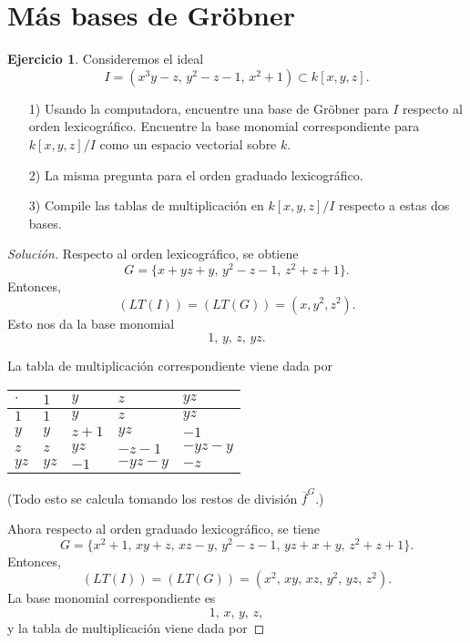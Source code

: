 \documentclass{article}
\theoremstyle{definition}
\newtheorem{ejerc}{Ejercicio}
\newenvironment{solucion}{\begin{proof}[Solución]}{\end{proof}}
\begin{document}

\section*{Más bases de Gröbner}

\begin{ejerc}
  Consideremos el ideal
  $$I = (x^3 y - z, \, y^2 - z - 1, \, x^2 + 1) \subset k[x,y,z].$$

  \begin{enumerate}
  \item[1)] Usando la computadora, encuentre una base de Gröbner para $I$
    respecto al orden lexicográfico. Encuentre la base monomial correspondiente
    para $k[x,y,z]/I$ como un espacio vectorial sobre $k$.

  \item[2)] La misma pregunta para el orden graduado lexicográfico.

  \item[3)] Compile las tablas de multiplicación en $k[x,y,z]/I$ respecto a
    estas dos bases.
  \end{enumerate}

  \ifdefined\solutions\begin{solucion}
    Respecto al orden lexicográfico, se obtiene
    $$G = \{ x+yz+y, \, y^2-z-1, \, z^2+z+1 \}.$$
    Entonces,
    $$(LT (I)) = (LT (G)) = (x, y^2, z^2).$$
    Esto nos da la base monomial
    $$1, \, y, \, z, \, yz.$$

    La tabla de multiplicación correspondiente viene dada por
    \begin{center}
\begin{tabular}{f{1.25cm}|f{1.25cm}|f{1.25cm}|f{1.25cm}|f{1.25cm}}
$\cdot$ & $1$ & $y$ & $z$ & $yz$ \tabularnewline
\hline
$1$ & $1$ & $y$ & $z$ & $yz$ \tabularnewline
\hline
$y$ & $y$ & $z+1$ & $yz$ & $-1$ \tabularnewline
\hline
$z$ & $z$ & $yz$ & $-z-1$ & $-yz - y$ \tabularnewline
\hline
$yz$ & $yz$ & $-1$ & $-yz - y$ & $-z$ \tabularnewline
\end{tabular}
    \end{center}
    (Todo esto se calcula tomando los restos de división $\overline{f}^G$.)

    Ahora respecto al orden graduado lexicográfico, se tiene
    $$G = \{ x^2+1, \, xy+z, \, xz-y, \, y^2-z-1, \, yz+x+y, \, z^2+z+1 \}.$$
    Entonces,
    $$(LT (I)) = (LT (G)) = (x^2, \, xy, \, xz, \, y^2, \, yz, \, z^2).$$
    La base monomial correspondiente es
    $$1, \, x, \, y, \, z,$$
    y la tabla de multiplicación viene dada por


\end{solucion}
\end{ejerc}
\end{document}
